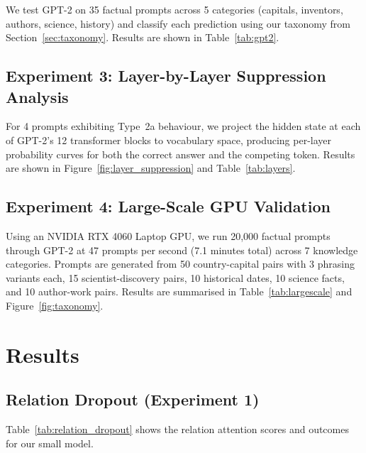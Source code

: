 \documentclass[11pt,a4paper]{article}
\begin{document}
We test GPT-2 on 35 factual prompts across 5 categories
(capitals, inventors, authors, science, history) and classify
each prediction using our taxonomy from
Section~\ref{sec:taxonomy}. Results are shown in
Table~\ref{tab:gpt2}.

\subsection{Experiment 3: Layer-by-Layer Suppression Analysis}

For 4 prompts exhibiting Type~2a behaviour, we project the
hidden state at each of GPT-2's 12 transformer blocks to
vocabulary space, producing per-layer probability curves for
both the correct answer and the competing token. Results are
shown in Figure~\ref{fig:layer_suppression} and
Table~\ref{tab:layers}.

\subsection{Experiment 4: Large-Scale GPU Validation}

Using an NVIDIA RTX 4060 Laptop GPU, we run 20,000 factual
prompts through GPT-2 at 47 prompts per second (7.1 minutes
total) across 7 knowledge categories. Prompts are generated
from 50 country-capital pairs with 3 phrasing variants each,
15 scientist-discovery pairs, 10 historical dates, 10 science
facts, and 10 author-work pairs. Results are summarised in
Table~\ref{tab:largescale} and Figure~\ref{fig:taxonomy}.

\section{Results}

\subsection{Relation Dropout (Experiment 1)}

Table~\ref{tab:relation_dropout} shows the relation attention
scores and outcomes for our small model.
\end{document}
